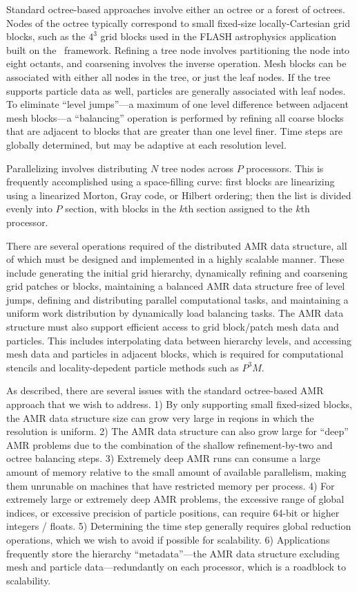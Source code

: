\documentclass[10pt,twocolumn]{article}
\begin{document}
Standard octree-based approaches involve either an octree or a forest
of octrees.  Nodes of the octree typically correspond to small
fixed-size locally-Cartesian grid blocks, such as the $4^3$ grid
blocks used in the FLASH astrophysics application built on the
\paramesh\ framework.  Refining a tree node involves partitioning the
node into eight octants, and coarsening involves the inverse
operation.  Mesh blocks can be associated with either all nodes in the
tree, or just the leaf nodes.  If the tree supports particle data as
well, particles are generally associated with leaf nodes.  To
eliminate ``level jumps''---a maximum of one level difference between
adjacent mesh blocks---a ``balancing'' operation is performed by
refining all coarse blocks that are adjacent to blocks that are
greater than one level finer.  Time steps are globally determined,
but may be adaptive at each resolution level.

Parallelizing involves distributing $N$ tree nodes across $P$
processors.  This is frequently accomplished using a space-filling
curve: first blocks are linearizing using a linearized Morton, Gray
code, or Hilbert ordering; then the list is divided evenly into $P$
section, with blocks in the $k$th section assigned to the $k$th
processor.

There are several operations required of the distributed AMR data
structure, all of which must be designed and implemented in a highly
scalable manner.  These include generating the initial grid hierarchy,
dynamically refining and coarsening grid patches or blocks,
maintaining a balanced AMR data structure free of level jumps,
defining and distributing parallel computational tasks, and
maintaining a uniform work distribution by dynamically load balancing
tasks.  The AMR data structure must also support efficient access to
grid block/patch mesh data and particles.  This includes interpolating
data between hierarchy levels, and accessing mesh data and particles
in adjacent blocks, which is required for computational stencils and
locality-depedent particle methods such as $P^3M$.

As described, there are several issues with the standard octree-based
AMR approach that we wish to address.  
%
1) By only supporting small fixed-sized blocks, the AMR data structure
size can grow very large in reqions in which the resolution is
uniform.
%
2) The AMR data structure can also grow large for ``deep'' AMR
problems due to the combination of the shallow refinement-by-two and
octree balancing steps.
%
3) Extremely deep AMR runs can consume a large amount of memory
relative to the small amount of available parallelism, making them
unrunable on machines that have restricted memory per process.
%
4) For extremely large or extremely deep AMR problems, the excessive
range of global indices, or excessive precision of particle positions,
can require 64-bit or higher integers / floats.
%
5) Determining the time step generally requires global reduction
operations, which we wish to avoid if possible for scalability.
%
6) Applications frequently store the hierarchy ``metadata''---the AMR
data structure excluding mesh and particle data---redundantly on each
processor, which is a roadblock to scalability.
\end{document}
